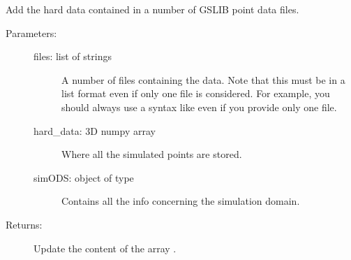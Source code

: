 \documentclass[letterpaper,10pt,english]{sphinxmanual}
\begin{document}
\begin{fulllineitems}
\label{\detokenize{appendices:s2Dcd.s2Dcd.add_gslib_pointdata}}
Add the hard data contained in a number of GSLIB point data files.
\begin{description}
\item[{Parameters:}] \leavevmode\begin{description}
\item[{files: list of strings}] \leavevmode
A number of files containing the data. Note that this must
be in a list format even if only one file is
considered. For example, you should always use a syntax
like  even if you provide only one file.

\item[{hard\_data: 3D numpy array}] \leavevmode
Where all the simulated points are stored.

\item[{simODS: object of type }] \leavevmode
Contains all the info concerning the simulation domain.

\end{description}

\item[{Returns:}] \leavevmode
Update the content of the array .

\end{description}

\end{fulllineitems}

\end{document}

